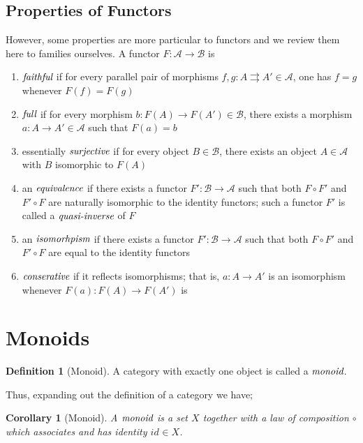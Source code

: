 \documentclass[10pt, oneside, reqno]{amsart}
\theoremstyle{plain}%
\newtheorem*{cor}{Corollary}
\theoremstyle{definition}
\newtheorem{defn}[thm]{Definition}
\theoremstyle{remark}
\newcommand{\Id}{\mathit{id}_}
\begin{document}
\subsection{Properties of Functors} %
\label{subsec:functorsproperties}
However, some properties are more particular to functors and we review them here to families ourselves.
A functor $F : \mathcal{A} \to \mathcal{B}$ is
\begin{enumerate}
 \item $\emph{faithful}$ if for every parallel pair of morphisms $f,g : A \rightrightarrows A' \in \mathcal{A}$, one has $f = g$ whenever $F(f) = F(g)$
 \item $\emph{full}$ if for every morphism $b: F(A) \to F(A') \in \mathcal{B}$, there exists a morphism $a: A \to A' \in \mathcal{A}$ such that $F(a) = b$
 \item essentially $\emph{surjective}$ if for every object $B \in \mathcal{B}$, there exists an object $A \in \mathcal{A}$ with $B$ isomorphic to $F(A)$
 \item an $\emph{equivalence}$ if there exists a functor $F': \mathcal{B} \to \mathcal{A}$ such that both $F \circ F'$ and $F' \circ F$ are naturally
 isomorphic to the identity functors; such a functor $F'$ is called a $\emph{quasi-inverse}$ of $F$
 \item an $\emph{isomorhpism}$ if there exists a functor $F': \mathcal{B} \to \mathcal{A}$ such that both $F \circ F'$ and $F' \circ F$
 are equal to the identity functors
 \item $\emph{conserative}$ if it reflects isomorphisms; that is, $a: A \to A'$ is an isomorphism whenever $F(a): F(A) \to F(A')$ is
\end{enumerate}


\section{Monoids} %
\label{sec:monoids}

\begin{defn}[Monoid]
 A category with exactly one object is called a $\emph{monoid}$.
\end{defn}

Thus, expanding out the definition of a category we have;
\begin{cor}[Monoid]
 A $\emph{monoid}$ is a set $X$ together with a law of composition $\circ$
 which associates and has identity $\Id{} \in X$.
\end{cor}
\end{document}
